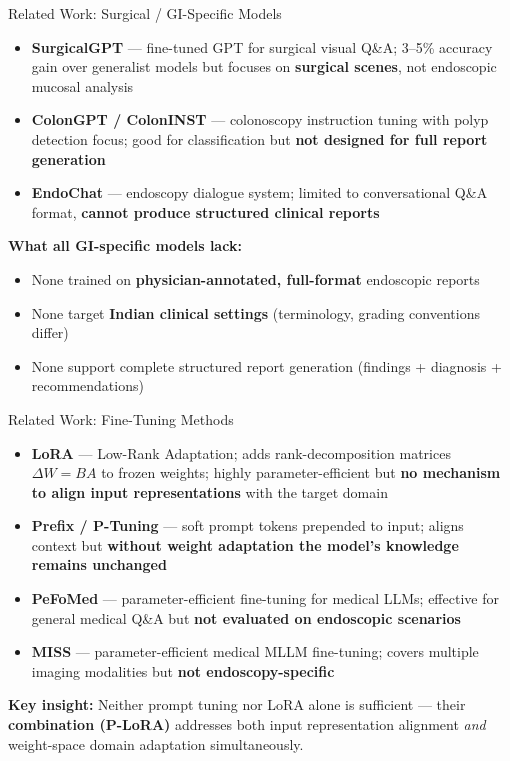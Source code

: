 ﻿\documentclass[aspectratio=169]{beamer}
\newcommand{\scite}[1]{{\footnotesize\color{darkgray}\citet{#1}}}
\begin{document}
\begin{frame}{Related Work: Surgical / GI-Specific Models}
\begin{itemize}
    \item \textbf{SurgicalGPT} --- fine-tuned GPT for surgical visual Q\&A; 3--5\% accuracy gain over generalist models but focuses on \textbf{surgical scenes}, not endoscopic mucosal analysis
    \item \textbf{ColonGPT / ColonINST} --- colonoscopy instruction tuning with polyp detection focus; good for classification but \textbf{not designed for full report generation}
    \item \textbf{EndoChat} --- endoscopy dialogue system; limited to conversational Q\&A format, \textbf{cannot produce structured clinical reports}
\end{itemize}
\vspace{0.8em}
\textbf{What all GI-specific models lack:}
\begin{itemize}
    \item None trained on \textbf{physician-annotated, full-format} endoscopic reports
    \item None target \textbf{Indian clinical settings} (terminology, grading conventions differ)
    \item None support complete structured report generation (findings + diagnosis + recommendations)
\end{itemize}
\end{frame}

\begin{frame}{Related Work: Fine-Tuning Methods}
\begin{itemize}
    \item \textbf{LoRA} \scite{lora2022hu} --- Low-Rank Adaptation; adds rank-decomposition matrices $\Delta W = BA$ to frozen weights; highly parameter-efficient but \textbf{no mechanism to align input representations} with the target domain
    \item \textbf{Prefix / P-Tuning} \scite{plora2022liu} --- soft prompt tokens prepended to input; aligns context but \textbf{without weight adaptation the model's knowledge remains unchanged}
    \item \textbf{PeFoMed} --- parameter-efficient fine-tuning for medical LLMs; effective for general medical Q\&A but \textbf{not evaluated on endoscopic scenarios}
    \item \textbf{MISS} --- parameter-efficient medical MLLM fine-tuning; covers multiple imaging modalities but \textbf{not endoscopy-specific}
\end{itemize}
\vspace{0.5em}
\textbf{Key insight:} Neither prompt tuning nor LoRA alone is sufficient --- their \textbf{combination (P-LoRA)} addresses both input representation alignment \textit{and} weight-space domain adaptation simultaneously.
\end{frame}
\end{document}
